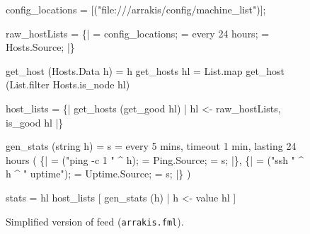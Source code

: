 



\begin{figure}
\begin{code}
 config_locations =
  [("file:///arrakis/config/machine_list")];

 raw_hostLists =  
   \{|
     =  config_locations;
    = every 24 hours; 
      = Hosts.Source;   |\}

 get_host (Hosts.Data h) = h
 get_hosts hl =
    List.map get_host 
     (List.filter Hosts.is_node hl)

 host_lists = 
  \{| get_hosts (get_good hl) | 
     hl <- raw_hostLists, is_good hl |\}

 gen_stats (string h) = 
   s = every 5 mins, 
          timeout 1 min, 
          lasting 24 hours 
  (
    \{| 
       =  ("ping -c 1 " ^ h);   
        = Ping.Source;  
      = s; |\},
    \{| 
       =  ("ssh " ^ h ^ " uptime");  
        = Uptime.Source;  
      = s; |\}
  )

 stats =
   hl  host_lists 
     [ gen_stats (h) | h <- value hl ]
\end{code}
\vspace*{-2ex}
\caption{Simplified version of \vizGems{} feed (\texttt{arrakis.fml}).}
\label{fig:pulse2}
\shrink
\end{figure}
